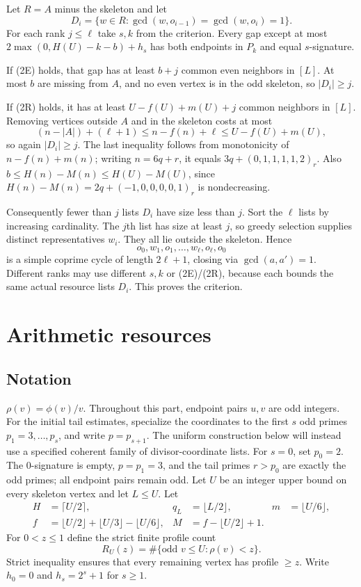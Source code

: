 Let $R=A$ minus the skeleton and let
\[
D_i=\{w\in R:\gcd(w,o_{i-1})=\gcd(w,o_i)=1\}.
\]
For each rank $j\le\ell$ take $s,k$ from the criterion. Every gap except at most $2\max(0,H(U)-k-b)+h_s$ has both endpoints in $P_k$ and equal $s$-signature.

If (2E) holds, that gap has at least $b+j$ common even neighbors in $[L]$. At most $b$ are missing from $A$, and no even vertex is in the odd skeleton, so $|D_i|\ge j$.

If (2R) holds, it has at least $U-f(U)+m(U)+j$ common neighbors in $[L]$. Removing vertices outside $A$ and in the skeleton costs at most
\[
(n-|A|)+(\ell+1)\le n-f(n)+\ell\le U-f(U)+m(U),
\]
so again $|D_i|\ge j$. The last inequality follows from monotonicity of $n-f(n)+m(n)$; writing $n=6q+r$, it equals $3q+(0,1,1,1,1,2)_r$.
Also $b\le H(n)-M(n)\le H(U)-M(U)$, since $H(n)-M(n)=2q+(-1,0,0,0,0,1)_r$ is nondecreasing.

Consequently fewer than $j$ lists $D_i$ have size less than $j$. Sort the $\ell$ lists by increasing cardinality. The $j$th list has size at least $j$, so greedy selection supplies distinct representatives $w_i$. They all lie outside the skeleton. Hence
\[
o_0,w_1,o_1,\ldots,w_\ell,o_\ell,o_0
\]
is a simple coprime cycle of length $2\ell+1$, closing via $\gcd(a,a')=1$. Different ranks may use different $s,k$ or (2E)/(2R), because each bounds the same actual resource lists $D_i$. This proves the criterion.

\section{Arithmetic resources}\label{sec:resources}

\subsection*{Notation}
$\rho(v)=\phi(v)/v$. Throughout this part, endpoint pairs $u,v$ are odd integers.
For the initial tail estimates, specialize the coordinates to the first $s$ odd primes $p_1=3,\ldots,p_s$, and write $p=p_{s+1}$. The uniform construction below will instead use a specified coherent family of divisor-coordinate lists.
For $s=0$, set $p_0=2$. The $0$-signature is empty, $p=p_1=3$, and the tail primes $r>p_0$ are exactly the odd primes; all endpoint pairs remain odd.
Let $U$ be an integer upper bound on every skeleton vertex and let $L\le U$.
Let
\[
\begin{aligned}
H&=\lceil U/2\rceil,& q_L&=\lfloor L/2\rfloor,& m&=\lfloor U/6\rfloor,\\
f&=\lfloor U/2\rfloor+\lfloor U/3\rfloor-\lfloor U/6\rfloor,
& M&=f-\lfloor U/2\rfloor+1.
\end{aligned}
\]
For $0<z\le1$ define the strict finite profile count
\[
R_U(z)=\#\{\text{odd }v\le U:\rho(v)<z\}.
\]
Strict inequality ensures that every remaining vertex has profile $\ge z$.
Write $h_0=0$ and $h_s=2^s+1$ for $s\ge1$.

